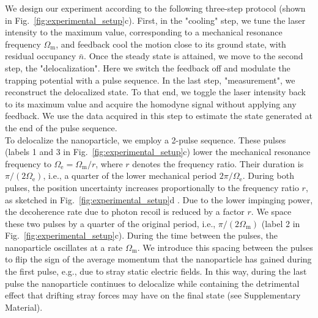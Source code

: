 \documentclass[aps,amssymb,amsmath,prl,superscriptaddress,reprint,noshowpacs]{revtex4-1}
\newcommand{\Om}{\Omega_\mathrm{m}}
\newcommand{\Oe}{\Omega_\mathrm{e}}
\begin{document}
We design our experiment according to the following three-step protocol (shown in Fig.~\ref{fig:experimental_setup}c).
%
First, in the "cooling" step, we tune the laser intensity to the maximum value, corresponding to a mechanical resonance frequency $\Om$, and feedback cool the motion close to its ground state, with residual occupancy $\bar{n}$.
%
Once the steady state is attained, we move to the second step, the "delocalization". Here we switch the feedback off and modulate the trapping potential with a pulse sequence.
%
In the last step, "measurement", we reconstruct the delocalized state.
%
To that end, we toggle the laser intensity back to its maximum value and acquire the homodyne signal without applying any feedback.
%
We use the data acquired in this step to estimate the state generated at the end of the pulse sequence.
\\
To delocalize the nanoparticle, we employ a 2-pulse sequence.
%
These pulses (labels 1 and 3 in Fig.~\ref{fig:experimental_setup}c) lower the mechanical resonance frequency to $\Oe = \Om/r$, where $r$ denotes the frequency ratio. 
%
Their duration is $\pi/(2\Oe)$, i.e., a quarter of the lower mechanical period $2\pi/\Oe$.
%
During both pulses, the position uncertainty increases proportionally to the frequency ratio $r$, as sketched in Fig.~\ref{fig:experimental_setup}d \cite{janszky_strong_1992}.
%
Due to the lower impinging power, the decoherence rate due to photon recoil is reduced by a factor $r$.
%
We space these two pulses by a quarter of the original period, i.e., $\pi/(2\Om)$ (label 2 in Fig.~\ref{fig:experimental_setup}c).
%
During the time between the pulses, the nanoparticle oscillates at a rate $\Om$.
%
We introduce this spacing between the pulses to flip the sign of the average momentum that the nanoparticle has gained during the first pulse, e.g., due to stray static electric fields.
%
In this way, during the last pulse the nanoparticle continues to delocalize while containing the detrimental effect that drifting stray forces may have on the final state (see Supplementary Material).
%
\end{document}
